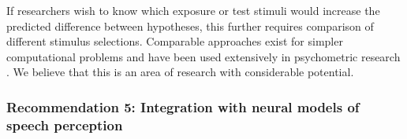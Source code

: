 \documentclass[
  11pt,
  man,floatsintext]{apa6}
\begin{document}
If researchers wish to know which exposure or test stimuli would increase the predicted difference between hypotheses, this further requires comparison of different stimulus selections. Comparable approaches exist for simpler computational problems and have been used extensively in psychometric research \autocites[incl.~online stimulus selection during the experiment, depending on subject-specific performance, e.g.,][]{vul2011,prins2013}. We believe that this is an area of research with considerable potential.

\subsubsection{Recommendation 5: Integration with neural models of speech perception}\label{recommendation-5-integration-with-neural-models-of-speech-perception}
\end{document}
